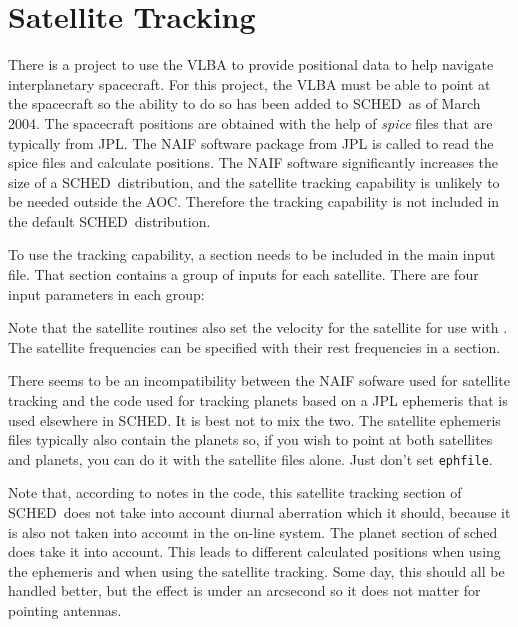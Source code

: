 \documentclass{report}
\newcommand{\schedb}{{\sc SCHED~}}
\begin{document}
\section{\label{SEC:SATEL}Satellite Tracking}

There is a project to use the VLBA to provide positional data to help
navigate interplanetary spacecraft.  For this project, the VLBA must
be able to point at the spacecraft so the ability to do so has been
added to \schedb as of March 2004.  The spacecraft positions are
obtained with the help of {\sl spice} files that are typically from
JPL.  The NAIF software package from JPL is called to read the spice
files and calculate positions.  The NAIF software significantly
increases the size of a \schedb distribution, and the satellite
tracking capability is unlikely to be needed outside the AOC.
Therefore the tracking capability is not included in the default
\schedb distribution.

To use the tracking capability, a  section needs to be included in the
main input file.  That section contains a group of inputs for each
satellite.  There are four input parameters in each group:

Note that the satellite routines also set the velocity for the
satellite for use with .
The satellite frequencies can be specified with their rest frequencies
in a  section.

There seems to be an incompatibility between the NAIF sofware used for
satellite tracking and the code used for tracking planets based on a
JPL ephemeris that is used elsewhere in SCHED.  It is best not to mix
the two.  The satellite ephemeris files typically also contain the
planets so, if you wish to point at both satellites and planets, you
can do it with the satellite files alone.  Just don't set {\tt ephfile}.

Note that, according to notes in the code, this satellite tracking
section of \schedb does not take into account diurnal aberration which
it should, because it is also not taken into account in the on-line
system.  The planet section of sched does take it into account.  This
leads to different calculated positions when using the ephemeris and
when using the satellite tracking.  Some day, this should all be
handled better, but the effect is under an arcsecond so it does not
matter for pointing antennas.
\end{document}
